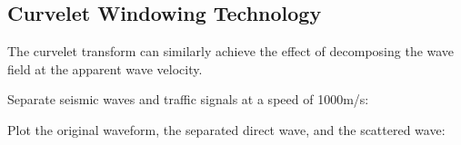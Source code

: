 \documentclass[letterpaper,10pt,english]{sphinxmanual}
\let\sphinxpxdimen\pdfpxdimen\else\newdimen\sphinxpxdimen
\begin{document}
\begin{sphinxVerbatim}[commandchars=\\\{\}]
    \PYG{p}{[}\PYG{p}{]}  \PYG{p}{[}\PYG{p}{]} 
\end{sphinxVerbatim}

\noindent\sphinxincludegraphics[width=700\sphinxpxdimen]{{fk_filter}.png}


\subsection{Curvelet Windowing Technology}
\label{\detokenize{Wavefield Decomposition:curvelet-windowing-technology}}\label{\detokenize{Wavefield Decomposition:id2}}
\sphinxAtStartPar
The curvelet transform can similarly achieve the effect of decomposing the wave field at the apparent wave velocity.

\sphinxAtStartPar
Separate seismic waves and traffic signals at a speed of 1000m/s:

\begin{sphinxVerbatim}[commandchars=\\\{\}]
    
\end{sphinxVerbatim}

\sphinxAtStartPar
Plot the original waveform, the separated direct wave, and the scattered wave:
\end{document}
